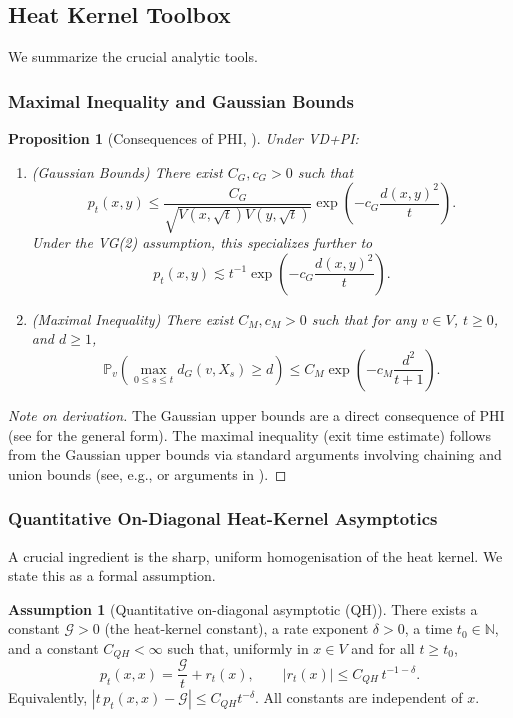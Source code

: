 \documentclass[reqno]{amsart}
\numberwithin{equation}{section}
\newtheorem{proposition}[proposition]{Proposition}
\theoremstyle{definition}
\newtheorem{assumption}[assumption]{Assumption}
\theoremstyle{remark}
\newcommand{\cG}{\mathcal{G}}
\newcommand{\N}{\mathbb{N}}
\newcommand{\Prob}{\mathbb{P}}
\begin{document}
\subsection{Heat Kernel Toolbox}
We summarize the crucial analytic tools.

\subsubsection{Maximal Inequality and Gaussian Bounds}


\begin{proposition}[Consequences of PHI, \cite{Delmotte99, Grigoryan09}]\label{prop:maximal}
Under VD+PI:
\begin{enumerate}

    \item (Gaussian Bounds) There exist $C_G, c_G > 0$ such that
    \[
    p_t(x,y) \leq \frac{C_G}{\sqrt{V(x,\sqrt{t}) V(y,\sqrt{t})}} \exp\left(-c_G \frac{d(x,y)^2}{t}\right).
    \]
    Under the VG(2) assumption, this specializes further to
    \[
    p_t(x,y) \lesssim t^{-1} \exp\left(-c_G \frac{d(x,y)^2}{t}\right).
    \]
    \item (Maximal Inequality) There exist $C_M,c_M > 0$ such that for any $v \in V$, $t \geq 0$, and $d \geq 1$,
    {\small
    \begin{equation}\label{eq:max_ineq}
    \Prob_v\left( \max_{0 \leq s \leq t} d_G(v,X_s) \geq d \right) \leq C_M \exp\left(-c_M \frac{d^2}{t+1}\right).
    \end{equation}}
\end{enumerate}
\end{proposition}
\begin{proof}[Note on derivation]
The Gaussian upper bounds are a direct consequence of PHI (see \cite{Delmotte99} for the general form). The maximal inequality (exit time estimate) follows from the Gaussian upper bounds via standard arguments involving chaining and union bounds (see, e.g., \cite[Theorem 5.5.3]{Grigoryan09} or arguments in \cite{Delmotte99}).
\end{proof}


\subsubsection{Quantitative On-Diagonal Heat-Kernel Asymptotics}
A crucial ingredient is the sharp, uniform homogenisation of the heat kernel. We state this as a formal assumption.

\begin{assumption}[Quantitative on-diagonal asymptotic (QH)]\label{ass:QH}
There exists a constant $\cG > 0$ (the heat-kernel constant), a rate exponent $\delta>0$, a time $t_0\in\N$, and a constant $C_{QH}<\infty$ such that, uniformly in $x\in V$ and for all $t\ge t_0$,
\begin{equation}\label{eq:return-prob}
  p_t(x,x) = \frac{\cG}{t} + r_t(x),\qquad |r_t(x)| \le C_{QH}\, t^{-1-\delta}.
\end{equation}
Equivalently, $|t\,p_t(x,x)-\cG|\le C_{QH} t^{-\delta}$. All constants are independent of $x$.
\end{assumption}
\end{document}
